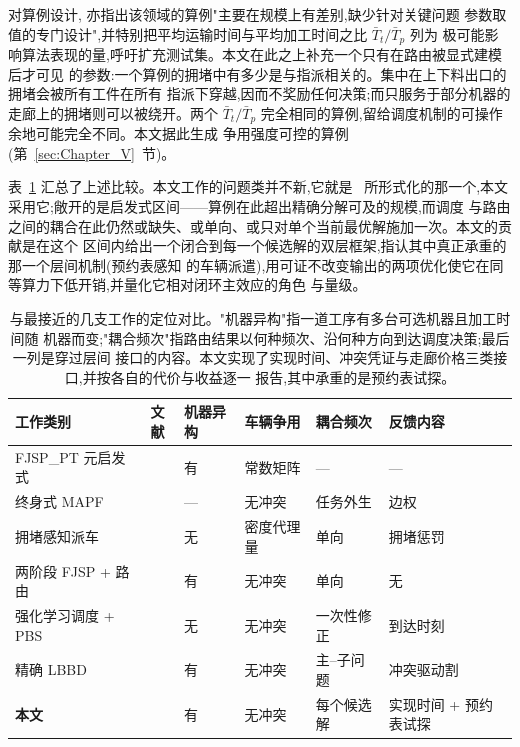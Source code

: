 \documentclass[manuscript,screen,review]{acmart}
\begin{document}
对算例设计,\cite{xin2025review} 亦指出该领域的算例"主要在规模上有差别,缺少针对关键问题
参数取值的专门设计",并特别把平均运输时间与平均加工时间之比 $\bar{T}_t/\bar{T}_p$ 列为
极可能影响算法表现的量,呼吁扩充测试集。本文在此之上补充一个只有在路由被显式建模后才可见
的参数:一个算例的拥堵中有多少是与指派相关的。集中在上下料出口的拥堵会被所有工件在所有
指派下穿越,因而不奖励任何决策;而只服务于部分机器的走廊上的拥堵则可以被绕开。两个
$\bar{T}_t/\bar{T}_p$ 完全相同的算例,留给调度机制的可操作余地可能完全不同。本文据此生成
争用强度可控的算例(第~\ref{sec:Chapter_V}~节)。

表~\ref{tab:related} 汇总了上述比较。本文工作的问题类并不新,它就是~\cite{vanos2026exact}
所形式化的那一个,本文采用它;敞开的是启发式区间——算例在此超出精确分解可及的规模,而调度
与路由之间的耦合在此仍然或缺失、或单向、或只对单个当前最优解施加一次。本文的贡献是在这个
区间内给出一个闭合到每一个候选解的双层框架,指认其中真正承重的那一个层间机制(预约表感知
的车辆派遣),用可证不改变输出的两项优化使它在同等算力下低开销,并量化它相对闭环主效应的角色
与量级。

\begin{table}[t]
\caption{与最接近的几支工作的定位对比。"机器异构"指一道工序有多台可选机器且加工时间随
机器而变;"耦合频次"指路由结果以何种频次、沿何种方向到达调度决策;最后一列是穿过层间
接口的内容。本文实现了实现时间、冲突凭证与走廊价格三类接口,并按各自的代价与收益逐一
报告,其中承重的是预约表试探。}
\label{tab:related}
\footnotesize
\begin{tabular}{@{}lclll l@{}}
\toprule
工作类别 & 文献 & 机器异构 & 车辆争用 & 耦合频次 & 反馈内容 \\
\midrule
FJSP\_PT 元启发式 & \cite{meng2025cp,qin2026knowledge,fu2025integrated}
  & 有 & 常数矩阵 & --- & --- \\
终身式 MAPF & \cite{zhang2024guidance}
  & --- & 无冲突 & 任务外生 & 边权 \\
拥堵感知派车 & \cite{kim2026congestion}
  & 无 & 密度代理量 & 单向 & 拥堵惩罚 \\
两阶段 FJSP + 路由 & \cite{sun2023integrated}
  & 有 & 无冲突 & 单向 & 无 \\
强化学习调度 + PBS & \cite{li2026framework}
  & 无 & 无冲突 & 一次性修正 & 到达时刻 \\
精确 LBBD & \cite{vanos2026exact}
  & 有 & 无冲突 & 主--子问题 & 冲突驱动割 \\
\textbf{本文} &
  & 有 & 无冲突 & 每个候选解 & 实现时间 + 预约表试探 \\
\bottomrule
\end{tabular}
\end{table}
\end{document}
